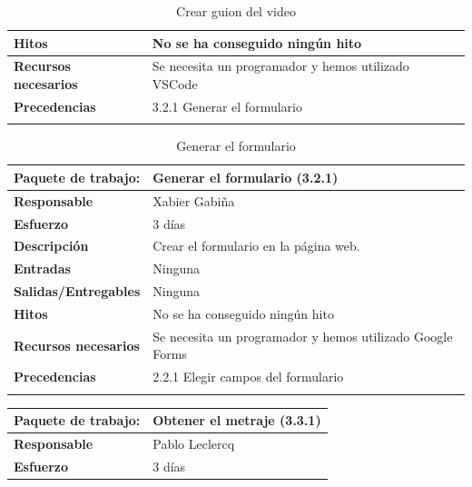 \documentclass{report}
\begin{document}
\begin{center}
\begin{longtable}{|p{6cm}|p{6cm}|}
                    \hline
                    \textbf{Hitos} & No se ha conseguido ningún hito\\
                    \hline
                    \textbf{Recursos necesarios} & Se necesita un programador y hemos utilizado VSCode\\
                    \hline
                    \textbf{Precedencias} & 3.2.1 Generar el formulario\\
                    \hline
                    \caption{Crear guion del video}
                \end{longtable}
                \begin{longtable}{|p{6cm}|p{6cm}|}
                    \hline
                    \textbf{Paquete de trabajo:} & Generar el formulario (3.2.1)\\
                    \hline
                    \textbf{Responsable} & Xabier Gabiña\\
                    \hline
                    \textbf{Esfuerzo} & 3 días\\
                    \hline
                    \textbf{Descripción} & Crear el formulario en la página web.\\
                    \hline
                    \textbf{Entradas} & Ninguna\\
                    \hline
                    \textbf{Salidas/Entregables} & Ninguna \\
                    \hline
                    \textbf{Hitos} & No se ha conseguido ningún hito\\
                    \hline
                    \textbf{Recursos necesarios} & Se necesita un programador y hemos utilizado Google Forms\\
                    \hline
                    \textbf{Precedencias} & 2.2.1 Elegir campos del formulario\\
                    \hline
                    \caption{Generar el formulario}
                \end{longtable}
                \clearpage
                \begin{longtable}{|p{6cm}|p{6cm}|}
                    \hline
                    \textbf{Paquete de trabajo:} & Obtener el metraje (3.3.1)\\
                    \hline
                    \textbf{Responsable} & Pablo Leclercq\\
                    \hline
                    \textbf{Esfuerzo} & 3 días\\

\end{longtable}
\end{center}
\end{document}
